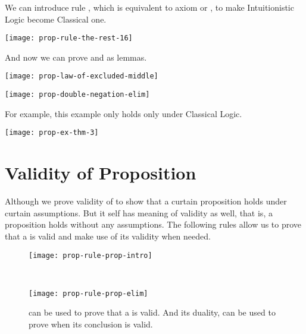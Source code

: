 \documentclass[master.tex]{subfiles}
\begin{document}
We can introduce rule , which is equivalent to
axiom  or , to make
Intuitionistic Logic become Classical one.

\begin{center}
\texttt{[image: prop-rule-the-rest-16]}
\end{center}

And now we can prove  and
 as lemmas.

\begin{center}
  \texttt{[image: prop-law-of-excluded-middle]}
\end{center}

\begin{center}
  \texttt{[image: prop-double-negation-elim]}
\end{center}

\hspace{1ex}

For example, this example only holds only under Classical Logic.

\hspace{1ex}

\begin{center}
  \texttt{[image: prop-ex-thm-3]}
\end{center}

\newpage

\section{Validity of Proposition}
\label{sec:validity_of_proposition}

Although we prove validity of  to show that a curtain proposition
holds under curtain assumptions. But  it self has meaning of validity
as well, that is, a proposition holds without any assumptions. The following
rules allow us to prove that a  is valid and make use of its validity
when needed.

\begin{figure}[H]
    \centering


\begin{minipage}{0.48\textwidth}
\begin{flushleft}
\texttt{[image: prop-rule-prop-intro]}
\end{flushleft}
\end{minipage}
~
\begin{minipage}{0.48\textwidth}
\begin{flushright}
\texttt{[image: prop-rule-prop-elim]}
\end{flushright}
\end{minipage}

\caption{ can be used to prove that a  is valid.
  And its duality,  can be used to prove  when
  its conclusion is valid.}
\label{fig:prop-rule-prop-intro-elim}
\end{figure}
\end{document}
